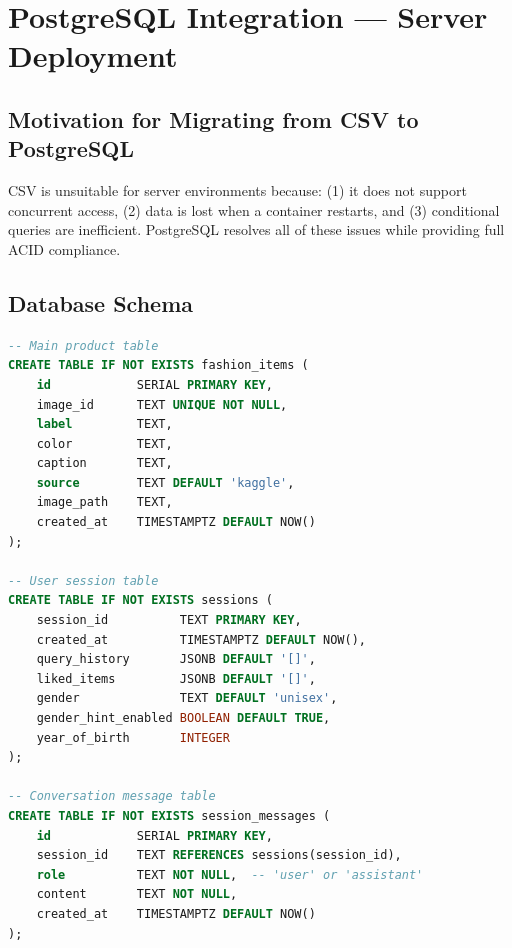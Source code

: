 \documentclass[12pt, twoside]{report}
\begin{document}
\chapter{PostgreSQL Integration --- Server Deployment}

\section{Motivation for Migrating from CSV to PostgreSQL}
\begin{tcolorbox}[title=Note]
CSV is unsuitable for server environments because: (1) it does not support concurrent access, (2) data is lost when a container restarts, and (3) conditional queries are inefficient. PostgreSQL resolves all of these issues while providing full ACID compliance.
\end{tcolorbox}

\section{Database Schema}

\begin{lstlisting}[language=sql,caption={PostgreSQL schema for the Fashion Agent}]
-- Main product table
CREATE TABLE IF NOT EXISTS fashion_items (
    id            SERIAL PRIMARY KEY,
    image_id      TEXT UNIQUE NOT NULL,
    label         TEXT,
    color         TEXT,
    caption       TEXT,
    source        TEXT DEFAULT 'kaggle',
    image_path    TEXT,
    created_at    TIMESTAMPTZ DEFAULT NOW()
);

-- User session table
CREATE TABLE IF NOT EXISTS sessions (
    session_id          TEXT PRIMARY KEY,
    created_at          TIMESTAMPTZ DEFAULT NOW(),
    query_history       JSONB DEFAULT '[]',
    liked_items         JSONB DEFAULT '[]',
    gender              TEXT DEFAULT 'unisex',
    gender_hint_enabled BOOLEAN DEFAULT TRUE,
    year_of_birth       INTEGER
);

-- Conversation message table
CREATE TABLE IF NOT EXISTS session_messages (
    id            SERIAL PRIMARY KEY,
    session_id    TEXT REFERENCES sessions(session_id),
    role          TEXT NOT NULL,  -- 'user' or 'assistant'
    content       TEXT NOT NULL,
    created_at    TIMESTAMPTZ DEFAULT NOW()
);
\end{lstlisting}
\end{document}
